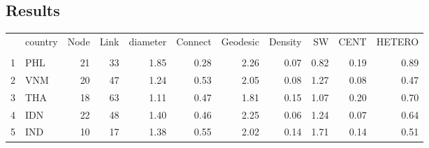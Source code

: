 \documentclass[a4paper]{article}
\begin{document}
\subsection*{Results}
\begin{table}[ht]
\centering
\begin{tabular}{rlrrrrrrrrr}
  \hline
 & country & Node & Link & diameter & Connect & Geodesic & Density & SW & CENT & HETERO \\ 
 \\
  \hline
1 & PHL &  21 & 33 & 1.85 & 0.28 & 2.26 & 0.07 & 0.82 & 0.19 & 0.89 \\ 
  2 & VNM &  20 & 47 & 1.24 & 0.53 & 2.05 & 0.08 & 1.27 & 0.08 & 0.47 \\ 
  3 & THA &  18 & 63 & 1.11 & 0.47 & 1.81 & 0.15 & 1.07 & 0.20 & 0.70 \\ 
  4 & IDN &  22 & 48 & 1.40 & 0.46 & 2.25 & 0.06 & 1.24 & 0.07 & 0.64 \\ 
  5 & IND &  10 & 17 & 1.38 & 0.55 & 2.02 & 0.14 & 1.71 & 0.14 & 0.51 \\ 
   \hline
\end{tabular}
\end{table}
\end{document}
